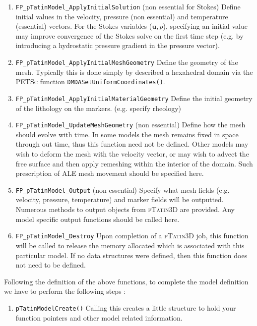 \documentclass[paper=a4, fontsize=10pt,twoside]{scrartcl}
\newcommand{\ptat}{{{\textsc{pTatin3D}}}}
\newcommand{\PETSc}{{{\textsc{PETSc}}}}
\newcommand{\unix}[1]{\texttt{\footnotesize #1}}
\begin{document}
{{\begin{enumerate}
	\item \unix{FP\_pTatinModel\_ApplyInitialSolution} (non essential for Stokes)
	Define initial values in the velocity, pressure (non essential) and temperature (essential) vectors. For the Stokes variables ($\boldsymbol u,p$), specifying an initial value may improve convergence of the Stokes solve on the first time step (e.g. by introducing a hydrostatic pressure gradient in the pressure vector).

	\item \unix{FP\_pTatinModel\_ApplyInitialMeshGeometry}
	Define the geometry of the mesh. Typically this is done simply by described a hexahedral domain via the {\PETSc} function \unix{DMDASetUniformCoordinates()}.

	\item \unix{FP\_pTatinModel\_ApplyInitialMaterialGeometry}
	Define the initial geometry of the lithology on the markers. (e.g. specify rheology)

	\item \unix{FP\_pTatinModel\_UpdateMeshGeometry} (non essential)
	Define how the mesh should evolve with time. In some models the mesh remains fixed in space through out time, thus this function need not be defined. Other models may wish to deform the mesh with the velocity vector, or may wish to advect the free surface and then apply remeshing within the interior of the domain. Such prescription of ALE mesh movement should be specified here.

	\item \unix{FP\_pTatinModel\_Output} (non essential)
	Specify what mesh fields (e.g. velocity, pressure, temperature) and marker fields will be outputted. Numerous
	methods to output objects from {\ptat} are provided. Any model specific output functions should be called here.

	\item \unix{FP\_pTatinModel\_Destroy}
	Upon completion of a {\ptat} job, this function will be called to release the memory allocated which is associated
	with this particular model. If no data structures were defined, then this function does not need to be defined.
\end{enumerate}

Following the definition of the above functions, to complete the model definition we have to perform the following steps :
\begin{enumerate}
	\item \unix{pTatinModelCreate()}
Calling this creates a little structure to hold your function pointers and other model related information.


\end{enumerate}}}
\end{document}
